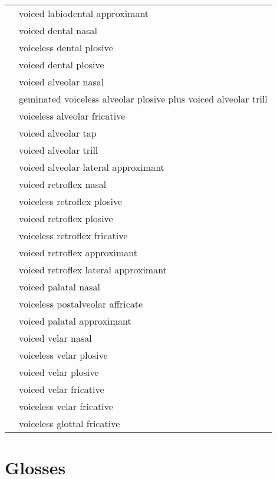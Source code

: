 \documentclass{article}
\begin{document}
\begin{xltabular}{\textwidth}{lL}
   & voiced labiodental approximant \\
   & voiced dental nasal \\
   & voiceless dental plosive \\
   & voiced dental plosive \\
   & voiced alveolar nasal \\
   & geminated voiceless alveolar plosive plus voiced alveolar trill \\
   & voiceless alveolar fricative \\
   & voiced alveolar tap \\
   & voiced alveolar trill \\
   & voiced alveolar lateral approximant \\
   & voiced retroflex nasal \\
   & voiceless retroflex plosive \\
   & voiced retroflex plosive \\
   & voiceless retroflex fricative \\
   & voiced retroflex approximant \\
   & voiced retroflex lateral approximant \\
  \ipa{\textltailn} & voiced palatal nasal \\
  \ipa{\t{\textteshlig}} & voiceless postalveolar affricate \\
   & voiced palatal approximant \\
   & voiced velar nasal \\
   & voiceless velar plosive \\
   & voiced velar plosive \\
   & voiced velar fricative \\
   & voiceless velar fricative \\
   & voiceless glottal fricative \\
\end{xltabular}

\newpage\section{Glosses}
\end{document}
